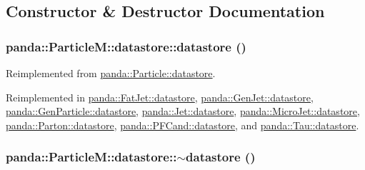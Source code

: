 \subsection{Constructor \& Destructor Documentation}
\hypertarget{structpanda_1_1ParticleM_1_1datastore_acc9af307e2c4fee9bc5d9bbb37ad6124}{
\subsubsection[{datastore}]{\setlength{\rightskip}{0pt plus 5cm}panda::ParticleM::datastore::datastore ()}}
\label{structpanda_1_1ParticleM_1_1datastore_acc9af307e2c4fee9bc5d9bbb37ad6124}


Reimplemented from \hyperlink{structpanda_1_1Particle_1_1datastore_a6e59a47437e52ced2f9605926e0de284}{panda::Particle::datastore}.

Reimplemented in \hyperlink{structpanda_1_1FatJet_1_1datastore_a9705a085f7cb1355b03cbfff4f580dbf}{panda::FatJet::datastore}, \hyperlink{structpanda_1_1GenJet_1_1datastore_ad0ca5d1b0381eb65489787ba810fa69a}{panda::GenJet::datastore}, \hyperlink{structpanda_1_1GenParticle_1_1datastore_ad1aab7880b9699f04e712abc69799953}{panda::GenParticle::datastore}, \hyperlink{structpanda_1_1Jet_1_1datastore_ae927a2e58d5ac6418b839d01dac0bd37}{panda::Jet::datastore}, \hyperlink{structpanda_1_1MicroJet_1_1datastore_adac05a4e9f5487a0932162ad3781f8aa}{panda::MicroJet::datastore}, \hyperlink{structpanda_1_1Parton_1_1datastore_aa447f1603ab6cfdf50e6406d1ef00819}{panda::Parton::datastore}, \hyperlink{structpanda_1_1PFCand_1_1datastore_a43d1760f6d3b403fea68a112cca0b2a7}{panda::PFCand::datastore}, and \hyperlink{structpanda_1_1Tau_1_1datastore_a48102b990097fe44c912c4a155786846}{panda::Tau::datastore}.\hypertarget{structpanda_1_1ParticleM_1_1datastore_ae068980c20730bc8565d2f7ea701bc5e}{
\subsubsection[{$\sim$datastore}]{\setlength{\rightskip}{0pt plus 5cm}panda::ParticleM::datastore::$\sim$datastore ()}}
\label{structpanda_1_1ParticleM_1_1datastore_ae068980c20730bc8565d2f7ea701bc5e}


